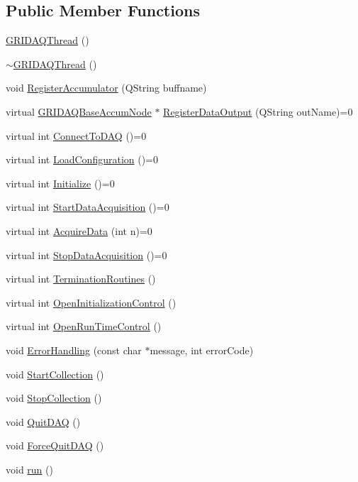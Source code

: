 \subsection*{\-Public \-Member \-Functions}
\begin{DoxyCompactItemize}
\item 
\hyperlink{classGRIDAQThread_afae9c0d5c166819a62e0c007be434a85}{\-G\-R\-I\-D\-A\-Q\-Thread} ()
\item 
\hyperlink{classGRIDAQThread_a92ac913769a806d23fd536f6e5e322a9}{$\sim$\-G\-R\-I\-D\-A\-Q\-Thread} ()
\item 
void \hyperlink{classGRIDAQThread_ad6b0768a1252bde2b8555ff9a490d75a}{\-Register\-Accumulator} (\-Q\-String buffname)
\item 
virtual \hyperlink{classGRIDAQBaseAccumNode}{\-G\-R\-I\-D\-A\-Q\-Base\-Accum\-Node} $\ast$ \hyperlink{classGRIDAQThread_a4b2ff5999f6ff469cb7e3ea72a91cb04}{\-Register\-Data\-Output} (\-Q\-String out\-Name)=0
\item 
virtual int \hyperlink{classGRIDAQThread_a04d24a6405844aade3bc1984afb0d4ff}{\-Connect\-To\-D\-A\-Q} ()=0
\item 
virtual int \hyperlink{classGRIDAQThread_acdaa152991368a10145ffad70ce18e01}{\-Load\-Configuration} ()=0
\item 
virtual int \hyperlink{classGRIDAQThread_afe09b93ab3979cfdf4527d29b9604e05}{\-Initialize} ()=0
\item 
virtual int \hyperlink{classGRIDAQThread_a4d1e7b575b1a929027a178a38d3181d5}{\-Start\-Data\-Acquisition} ()=0
\item 
virtual int \hyperlink{classGRIDAQThread_adc06b9f50eef58cdb68c44175c55e31f}{\-Acquire\-Data} (int n)=0
\item 
virtual int \hyperlink{classGRIDAQThread_afc6a783bc23328db695dffe37b9c3f48}{\-Stop\-Data\-Acquisition} ()=0
\item 
virtual int \hyperlink{classGRIDAQThread_adfa721927bdeb45c945746cd66325d6a}{\-Termination\-Routines} ()
\item 
virtual int \hyperlink{classGRIDAQThread_a94de629b18b07eb576399ab636dbcd95}{\-Open\-Initialization\-Control} ()
\item 
virtual int \hyperlink{classGRIDAQThread_ade05ba0862fdd12bf4febe3f51ad33d5}{\-Open\-Run\-Time\-Control} ()
\item 
void \hyperlink{classGRIDAQThread_a7ee059340926bf1363cf63b0f1d52084}{\-Error\-Handling} (const char $\ast$message, int error\-Code)
\item 
void \hyperlink{classGRIDAQThread_ab915412c9ddbcb473a353c14c821f2c2}{\-Start\-Collection} ()
\item 
void \hyperlink{classGRIDAQThread_a50eea7f13926eb23860744ecb1e79e58}{\-Stop\-Collection} ()
\item 
void \hyperlink{classGRIDAQThread_a641c8bb769bcc5eda1c2015bc063d402}{\-Quit\-D\-A\-Q} ()
\item 
void \hyperlink{classGRIDAQThread_a0985879e6f269de965f9ff039eb45119}{\-Force\-Quit\-D\-A\-Q} ()
\item 
void \hyperlink{classGRIDAQThread_ae65ca14666b051d8db1c453376c1cb7d}{run} ()
\end{DoxyCompactItemize}
